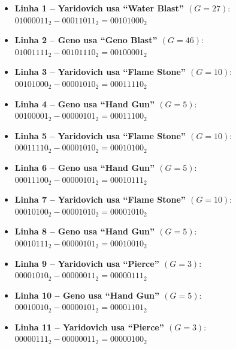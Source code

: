 \documentclass[12pt]{article}
\begin{document}
\begin{itemize}

\item \textbf{Linha 1 – Yaridovich usa ``Water Blast'' $(G=27)$}: $01000011_2 - 00011011_2 = 00101000_2$
\vspace{0.1cm}

\item \textbf{Linha 2 – Geno usa ``Geno Blast'' $(G=46)$}: $01001111_2 - 00101110_2 = 00100001_2$
\vspace{0.1cm}

\item \textbf{Linha 3 – Yaridovich usa ``Flame Stone'' $(G=10)$}: $00101000_2 - 00001010_2 = 00011110_2$
\vspace{0.1cm}

\item \textbf{Linha 4 – Geno usa ``Hand Gun'' $(G=5)$}: $00100001_2 - 00000101_2 = 00011100_2$
\vspace{0.1cm}

\item \textbf{Linha 5 – Yaridovich usa ``Flame Stone'' $(G=10)$}: $00011110_2 - 00001010_2 = 00010100_2$
\vspace{0.1cm}

\item \textbf{Linha 6 – Geno usa ``Hand Gun'' $(G=5)$}: $00011100_2 - 00000101_2 = 00010111_2$
\vspace{0.1cm}

\item \textbf{Linha 7 – Yaridovich usa ``Flame Stone'' $(G=10)$}: $00010100_2 - 00001010_2 = 00001010_2$
\vspace{0.1cm}

\item \textbf{Linha 8 – Geno usa ``Hand Gun'' $(G=5)$}: $00010111_2 - 00000101_2 = 00010010_2$
\vspace{0.1cm}

\item \textbf{Linha 9 – Yaridovich usa ``Pierce'' $(G=3)$}: $00001010_2 - 00000011_2 = 00000111_2$
\vspace{0.1cm}

\item \textbf{Linha 10 – Geno usa ``Hand Gun'' $(G=5)$}: $00010010_2 - 00000101_2 = 00001101_2$
\vspace{0.1cm}

\item \textbf{Linha 11 – Yaridovich usa ``Pierce'' $(G=3)$}: $00000111_2 - 00000011_2 = 00000100_2$
\vspace{0.1cm}


\end{itemize}
\end{document}
